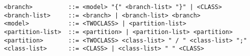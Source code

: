 \begin{verbatim}
<branch>          ::= <model> "{" <branch-list> "}" | <CLASS>
<branch-list>     ::= <branch> | <branch-list> <branch>
<model>           ::= <TWOCLASS> | <partition-list>
<partition-list>  ::= <partition> | <partition-list> <partition>
<partition>       ::= <TWOCLASS> <class-list> " / " <class-list> ";"
<class-list>      ::= <CLASS> | <class-list> " " <CLASS>
\end{verbatim}

